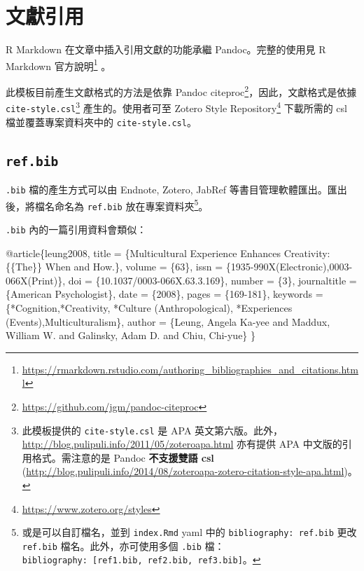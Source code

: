 \documentclass[oneside]{book}
\newenvironment{Shaded}{\begin{snugshade}}{\end{snugshade}}
\newcommand{\DataTypeTok}[1]{\textcolor[rgb]{0.13,0.29,0.53}{#1}}
\newcommand{\NormalTok}[1]{#1}
\newcommand{\OtherTok}[1]{\textcolor[rgb]{0.56,0.35,0.01}{#1}}
\newcommand{\VariableTok}[1]{\textcolor[rgb]{0.00,0.00,0.00}{#1}}
\renewcommand{\href}[2]{#2\footnote{\url{#1}}}
\theoremstyle{definition}
\theoremstyle{definition}
\theoremstyle{definition}
\theoremstyle{remark}
\begin{document}
\hypertarget{bib-cite}{%
\section{文獻引用}\label{bib-cite}}

R Markdown 在文章中插入引用文獻的功能承繼 Pandoc。完整的使用見 \href{https://rmarkdown.rstudio.com/authoring_bibliographies_and_citations.html}{R Markdown 官方說明} 。

此模板目前產生文獻格式的方法是依靠 \href{https://github.com/jgm/pandoc-citeproc}{Pandoc citeproc}，因此，文獻格式是依據 \texttt{cite-style.csl}\footnote{此模板提供的 \texttt{cite-style.csl} 是 APA 英文第六版。此外，\url{http://blog.pulipuli.info/2011/05/zoteroapa.html} 亦有提供 APA 中文版的引用格式。需注意的是 Pandoc \textbf{不支援雙語 csl} (\url{http://blog.pulipuli.info/2014/08/zoteroapa-zotero-citation-style-apa.html})。} 產生的。使用者可至 \href{https://www.zotero.org/styles}{Zotero Style Repository} 下載所需的 csl 檔並覆蓋專案資料夾中的 \texttt{cite-style.csl}。

\hypertarget{ref-bib}{%
\subsection{\texorpdfstring{\texttt{ref.bib}}{ref.bib}}\label{ref-bib}}

\texttt{.bib} 檔的產生方式可以由 Endnote, Zotero, JabRef 等書目管理軟體匯出。匯出後，將檔名命名為 \texttt{ref.bib} 放在專案資料夾\footnote{或是可以自訂檔名，並到 \texttt{index.Rmd} yaml 中的 \texttt{bibliography:\ ref.bib} 更改 \texttt{ref.bib} 檔名。此外，亦可使用多個 \texttt{.bib} 檔：\texttt{bibliography:\ {[}ref1.bib,\ ref2.bib,\ ref3.bib{]}}。}。

\texttt{.bib} 內的一篇引用資料會類似：

\begin{Shaded}
\begin{Highlighting}[]
\VariableTok{@article}\NormalTok{\{}\OtherTok{leung2008}\NormalTok{,}
  \DataTypeTok{title}\NormalTok{ = \{Multicultural Experience Enhances Creativity: \{\{The\}\} When and How.\},}
  \DataTypeTok{volume}\NormalTok{ = \{63\},}
  \DataTypeTok{issn}\NormalTok{ = \{1935-990X(Electronic),0003-066X(Print)\},}
  \DataTypeTok{doi}\NormalTok{ = \{10.1037/0003-066X.63.3.169\},}
  \DataTypeTok{number}\NormalTok{ = \{3\},}
  \DataTypeTok{journaltitle}\NormalTok{ = \{American Psychologist\},}
  \DataTypeTok{date}\NormalTok{ = \{2008\},}
  \DataTypeTok{pages}\NormalTok{ = \{169-181\},}
  \DataTypeTok{keywords}\NormalTok{ = \{*Cognition,*Creativity,}
\NormalTok{    *Culture (Anthropological),}
\NormalTok{    *Experiences (Events),Multiculturalism\},}
  \DataTypeTok{author}\NormalTok{ = \{Leung, Angela Ka-yee and }
\NormalTok{    Maddux, William W. and }
\NormalTok{    Galinsky, Adam D. and Chiu, Chi-yue\}}
\NormalTok{\}}
\end{Highlighting}
\end{Shaded}
\end{document}
